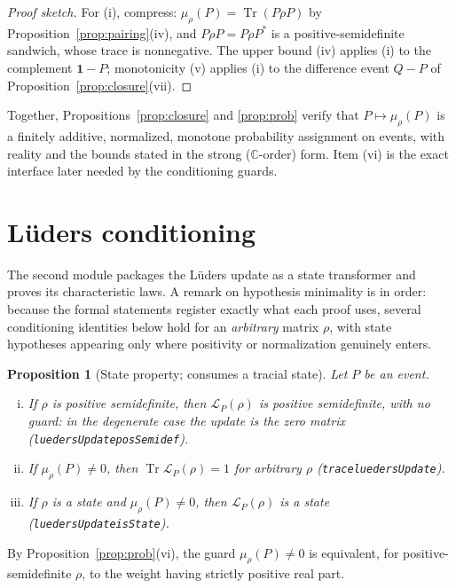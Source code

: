 \documentclass[11pt]{article}
\renewcommand{\_}{\textunderscore\allowbreak}
\newtheorem{proposition}{Proposition}
\theoremstyle{remark}
\newcommand{\C}{\mathbb C}
\newcommand{\Tr}{\operatorname{Tr}}
\newcommand{\one}{\mathbf 1}
\newcommand{\lued}{\mathcal L}
\begin{document}
\begin{proof}[Proof sketch]
For (i), compress: $\mu_\rho(P) = \Tr(P \rho P)$ by Proposition~\ref{prop:pairing}(iv), and $P \rho P = P \rho P^{*}$ is a positive-semidefinite sandwich, whose trace is nonnegative. The upper bound (iv) applies (i) to the complement $\one - P$; monotonicity (v) applies (i) to the difference event $Q - P$ of Proposition~\ref{prop:closure}(vii).
\end{proof}

Together, Propositions~\ref{prop:closure} and \ref{prop:prob} verify that $P \mapsto \mu_\rho(P)$ is a finitely additive, normalized, monotone probability assignment on events, with reality and the bounds stated in the strong ($\C$-order) form. Item (vi) is the exact interface later needed by the conditioning guards.

\section{L\"uders conditioning}
\label{sec:lueders}

The second module packages the L\"uders update as a state transformer and proves its characteristic laws. A remark on hypothesis minimality is in order: because the formal statements register exactly what each proof uses, several conditioning identities below hold for an \emph{arbitrary} matrix $\rho$, with state hypotheses appearing only where positivity or normalization genuinely enters.

\begin{proposition}[State property; consumes a tracial state]
\label{prop:update-state}
Let $P$ be an event.
\begin{enumerate}[(i)]
\item If $\rho$ is positive semidefinite, then $\lued_P(\rho)$ is positive semidefinite, with no guard: in the degenerate case the update is the zero matrix (\texttt{luedersUpdate\_posSemidef}).
\item If $\mu_\rho(P) \neq 0$, then $\Tr \lued_P(\rho) = 1$ for arbitrary $\rho$ (\texttt{trace\_luedersUpdate}).
\item If $\rho$ is a state and $\mu_\rho(P) \neq 0$, then $\lued_P(\rho)$ is a state (\texttt{luedersUpdate\_isState}).
\end{enumerate}
\end{proposition}

By Proposition~\ref{prop:prob}(vi), the guard $\mu_\rho(P) \neq 0$ is equivalent, for positive-semidefinite $\rho$, to the weight having strictly positive real part.
\end{document}
